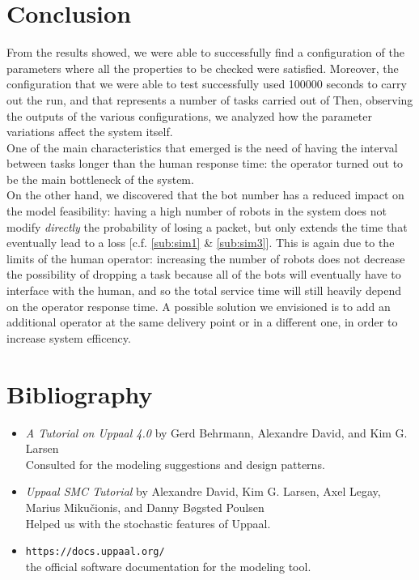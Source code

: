 \documentclass{article}
\begin{document}
	\section{Conclusion}
		From the results showed, we were able to successfully find a configuration of the parameters where all the properties to be checked were satisfied. Moreover, the configuration that we were able to test successfully used 100000 seconds to carry out the run, and that represents a number of tasks carried out of  %
		Then, observing the outputs of the various configurations, we analyzed how the parameter variations affect the system itself.\\
		One of the main characteristics that emerged is the need of having the interval between tasks longer than the human response time: the operator turned out to be the main bottleneck of the system.\\
		On the other hand, we discovered that the bot number has a reduced impact on the model feasibility: having a high number of robots in the system does not modify \emph{directly} the probability of losing a packet, but only extends the time that eventually lead to a loss [c.f. \ref{sub:sim1} \& \ref{sub:sim3}]. This is again due to the limits of the human operator: increasing the number of robots does not decrease the possibility of dropping a task because all of the bots will eventually have to interface with the human, and so the total service time will still heavily depend on the operator response time. A possible solution we envisioned is to add an additional operator at the same delivery point or in a different one, in order to increase system efficency. 

	\section{Bibliography}
		\begin{itemize}
			\item \emph{A Tutorial on Uppaal 4.0} by Gerd Behrmann, Alexandre David, and Kim G. Larsen \\
				Consulted for the modeling suggestions and design patterns.
			\item \emph{Uppaal SMC Tutorial} by Alexandre David, Kim G. Larsen, Axel Legay, Marius Mikučionis, and Danny Bøgsted Poulsen \\
				Helped us with the stochastic features of Uppaal.
			\item \verb|https://docs.uppaal.org/| \\ the official software documentation for the modeling tool.
		\end{itemize}
		
\end{document}
